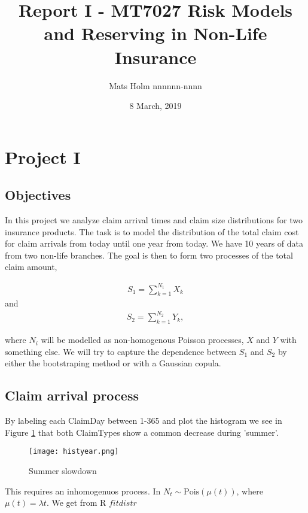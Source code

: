 \documentclass[11pt]{article}
\title{Report I - MT7027 Risk Models and Reserving in Non-Life Insurance}
\author{Mats Holm nnnnnn-nnnn }
\date{8 March, 2019}                                           %
\begin{document}
\maketitle
\section*{Project I}
\subsection*{Objectives}

In this project we analyze claim
arrival times and claim size distributions for two insurance products.
The task is to model
the distribution of the total claim cost for claim arrivals from today until one year from
today. We have 10 years of data from two non-life branches. The goal is then to form two processes of the total claim amount,

\begin{align} \label{eq:sum1}
	S_1 = \sum_{k=1}^{N_1}  X_k 
\end{align}
and
\begin{align} \label{eq:sum2}
	 S_2 = \sum_{k=1}^{N_2} Y_k,
\end{align}

where $N_i$ will be modelled as non-homogenous Poisson processes, $X$ and $Y$ with something else. We will try to capture the dependence between
$S_1$ and $S_2$ by  either the
bootstraping method or with a Gaussian copula.


\subsection*{Claim arrival process}
By labeling each ClaimDay between 1-365 and plot the histogram we see in Figure \ref{fig:samplefig1} that both ClaimTypes show a common decrease during 'summer'.
 \begin{figure}[H]
 \center
  \texttt{[image: histyear.png]}
  \caption{Summer slowdown}
  \label{fig:samplefig1}
\end{figure}

This requires an inhomogenuos process. In $N_t  \sim  \mathrm{Pois}(\mu(t))$, where  $\mu(t) = \lambda t$. We get from R $fitdistr$
\end{document}
